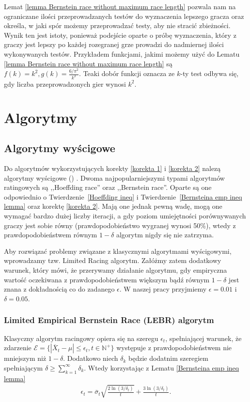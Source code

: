\documentclass[inzynierska]{pwr_wmat_praca_dyplomowa}
\theoremstyle{plain}
\numberwithin{theorem}{chapter}
\theoremstyle{definition}
\numberwithin{theorem}{chapter}
\begin{document}
	Lemat \ref{lemma Bernstein race without maximum race length} pozwala nam na ograniczane ilości przeprowadzanych testów do wyznaczenia lepszego gracza oraz określa, w jaki spór możemy  przeprowadzać  testy, aby nie stracić zbieżności.
	Wynik ten jest istoty, ponieważ podejście oparte o próbę wyznaczenia, który z graczy jest lepszy po każdej rozegranej grze prowadzi do nadmiernej ilości wykonywanych testów.
	Przykładem funkcjami, jakimi możemy użyć do Lematu \ref{lemma Bernstein race without maximum race length} są $f(k) = k^2, g(k) = \frac{6/\pi^2}{k^2}$. Teaki dobór funkcji oznacza ze $k$-ty test odbywa się, gdy liczba przeprowadzonych gier wynosi $k^2$.
	\chapter{Algorytmy}
	\section{Algorytmy wyścigowe}
	Do algorytmów wykorzystujących korekty \ref{korekta 1} i \ref{korekta 2} nalezą algorytmy wyścigowe () \cite{Mnih_2008}. Dwoma najpopularniejszymi typami algorytmów ratingowych są ,,Hoeffding race'' oraz ,,Bernstein race''.
	Oparte są one odpowiednio o Twierdzenie~\ref{Hoeffding ineq} i Twierdzenie~\ref{Bernsteina emp ineq lemma} oraz korektę \ref{korekta 2}. Mają one jednak pewną wadę, mogą one wymagać bardzo dużej liczby iteracji, a gdy poziom umiejętności porównywanych graczy jest sobie równy (prawdopodobieństwo wygranej wynosi 50\%), wtedy z prawdopodobieństwem równym $1-\delta$ algorytm nigdy się nie zatrzyma.
	
	Aby rozwiązać problemy związane z klasycznymi algorytmami wyścigowymi, wprowadzamy tzw. Limited Racing algorytm. Załóżmy zatem dodatkowy warunek, który mówi, że przerywamy działanie algorytmu, gdy empiryczna wartość oczekiwana z prawdopodobieństwem większym bądź równym $1-\delta$ jest znana z dokładnością co do zadanego $\epsilon$. W naszej pracy przyjmiemy $\epsilon=0.01$ i $\delta = 0.05$.
	\subsection{Limited Empirical Bernstein Race (LEBR) algorytm}
	Klasyczny algorytm racingowy opiera się na szeregu $\epsilon_t$, spełniającej warunek, że zdarzenie $\mathcal{E}= \{|\overline{X}_t - \mu | \le \epsilon_t,  t\in \mathbb{N}^+\}$ występuje z prawdopodobieństwem nie mniejszym niż $1-\delta$. Dodatkowo niech $\delta_k$ będzie dodatnim szeregiem spełniającym $ \delta \ge \sum_{k = 1}^{\infty}\delta_k$. Wtedy korzystając z Lematu \ref{Bernsteina emp ineq lemma}
	\begin{gather*}
		\epsilon_t =  \overline{\sigma}_t \sqrt{\frac{2\ln(3/\delta_t)}{t}} + \frac{3  \ln{(3 / \delta_t)}}{t}.
	\end{gather*}
\end{document}
